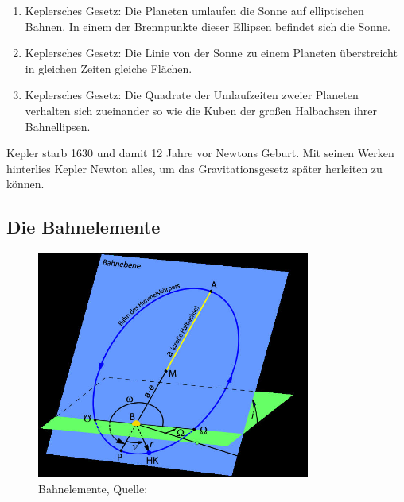 \begin{enumerate}
	\item Keplersches Gesetz: Die Planeten umlaufen die Sonne auf elliptischen Bahnen. In einem der Brennpunkte dieser Ellipsen befindet sich die Sonne. 
	\item Keplersches Gesetz: Die Linie von der Sonne zu einem Planeten überstreicht in gleichen Zeiten gleiche Flächen.
	\item Keplersches Gesetz: Die Quadrate der Umlaufzeiten zweier Planeten verhalten sich zueinander so wie die Kuben der großen Halbachsen ihrer Bahnellipsen. 
\end{enumerate}   
Kepler starb 1630 und damit 12 Jahre vor Newtons Geburt. Mit seinen Werken hinterlies Kepler Newton alles, um das Gravitationsgesetz später herleiten zu können. 
\subsection{Die Bahnelemente}
\begin{figure}[!htbp]                                                                       %
	\centering                                                                            	%
	\includegraphics[width=0.8\textwidth]{./images/bahnelemente.jpg}                        %
	\caption[Bahnelemente]{Bahnelemente, Quelle: \cite{Wiki:Bahnel}}                        %
	\label{fig:bahnelemente}                                                                %
\end{figure}                                                                              	%
